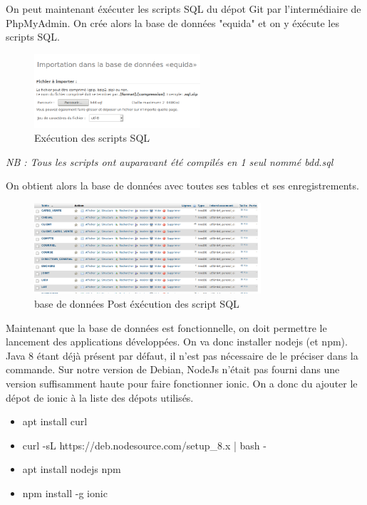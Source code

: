 \documentclass[report]{BetterDocument}
\newcommand{\bdd}{base de données}
\begin{document}
		On peut maintenant éxécuter les scripts SQL du dépot Git par l'intermédiaire de PhpMyAdmin. On crée alors la \bdd{} "equida" et on y éxécute les scripts SQL.

		\begin{figure}[H]
			\centering\includegraphics[width=0.55\textwidth, keepaspectratio]{res/sql-bdd.png}
			\caption{Exécution des scripts SQL}
		\end{figure}

		\textit{NB : Tous les scripts ont auparavant été compilés en 1 seul nommé bdd.sql}

		On obtient alors la \bdd{} avec toutes ses tables et ses enregistrements.

		\begin{figure}[H]
			\centering\includegraphics[width=0.75\textwidth, keepaspectratio]{res/bdd.png}
			\caption{\bdd{} Post éxécution des script SQL}
		\end{figure}

		Maintenant que la \bdd{} est fonctionnelle, on doit permettre le lancement des applications développées. On va donc installer nodejs (et npm). Java 8 étant déjà présent par défaut, il n'est pas nécessaire de le préciser dans la commande. Sur notre version de Debian, NodeJs n'était pas fourni dans une version suffisamment haute pour faire fonctionner ionic. On a donc du ajouter le dépot de ionic à la liste des dépots utilisés.

		\begin{itemize}
			\item{apt install curl}
			\item{curl -sL https://deb.nodesource.com/setup\_8.x | bash -}
 			\item{apt install nodejs npm}
			\item{npm install -g ionic}
		\end{itemize}
\end{document}
